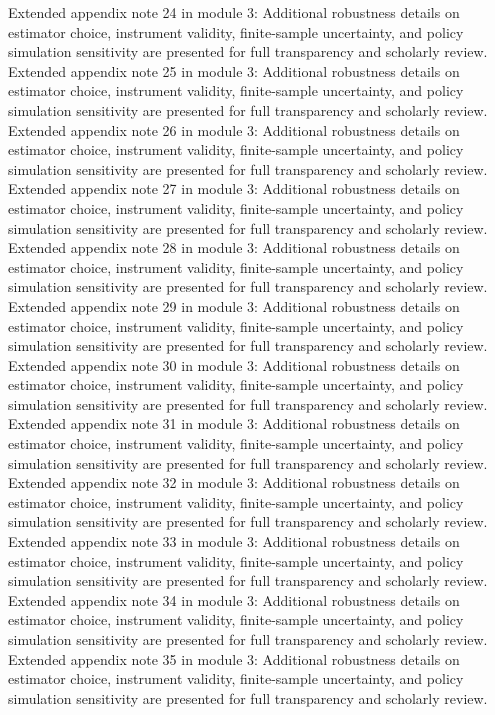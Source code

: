 \documentclass[preprint,12pt]{elsarticle}
\begin{document}
Extended appendix note 24 in module 3: Additional robustness details on estimator choice, instrument validity, finite-sample uncertainty, and policy simulation sensitivity are presented for full transparency and scholarly review.
Extended appendix note 25 in module 3: Additional robustness details on estimator choice, instrument validity, finite-sample uncertainty, and policy simulation sensitivity are presented for full transparency and scholarly review.
Extended appendix note 26 in module 3: Additional robustness details on estimator choice, instrument validity, finite-sample uncertainty, and policy simulation sensitivity are presented for full transparency and scholarly review.
Extended appendix note 27 in module 3: Additional robustness details on estimator choice, instrument validity, finite-sample uncertainty, and policy simulation sensitivity are presented for full transparency and scholarly review.
Extended appendix note 28 in module 3: Additional robustness details on estimator choice, instrument validity, finite-sample uncertainty, and policy simulation sensitivity are presented for full transparency and scholarly review.
Extended appendix note 29 in module 3: Additional robustness details on estimator choice, instrument validity, finite-sample uncertainty, and policy simulation sensitivity are presented for full transparency and scholarly review.
Extended appendix note 30 in module 3: Additional robustness details on estimator choice, instrument validity, finite-sample uncertainty, and policy simulation sensitivity are presented for full transparency and scholarly review.
Extended appendix note 31 in module 3: Additional robustness details on estimator choice, instrument validity, finite-sample uncertainty, and policy simulation sensitivity are presented for full transparency and scholarly review.
Extended appendix note 32 in module 3: Additional robustness details on estimator choice, instrument validity, finite-sample uncertainty, and policy simulation sensitivity are presented for full transparency and scholarly review.
Extended appendix note 33 in module 3: Additional robustness details on estimator choice, instrument validity, finite-sample uncertainty, and policy simulation sensitivity are presented for full transparency and scholarly review.
Extended appendix note 34 in module 3: Additional robustness details on estimator choice, instrument validity, finite-sample uncertainty, and policy simulation sensitivity are presented for full transparency and scholarly review.
Extended appendix note 35 in module 3: Additional robustness details on estimator choice, instrument validity, finite-sample uncertainty, and policy simulation sensitivity are presented for full transparency and scholarly review.
\end{document}
